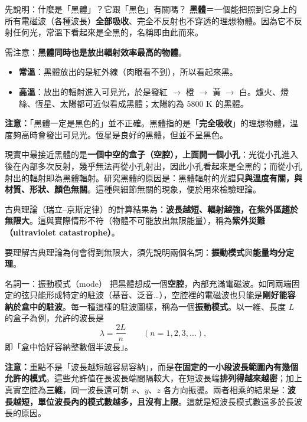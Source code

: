 \documentclass[11pt]{article}
\begin{document}
\begin{補充框}{先說明：什麼是「黑體」？它跟「黑色」有關嗎？}
\textbf{黑體}＝一個能把照到它身上的所有電磁波（各種波長）\textbf{全部吸收}、完全不反射也不穿透的理想物體。因為它不反射任何光，常溫下看起來是全黑的，名稱即由此而來。

需注意：\textbf{黑體同時也是放出輻射效率最高的物體}。

\begin{itemize}\setlength{\itemsep}{1pt}
\item \textbf{常溫}：黑體放出的是紅外線（肉眼看不到），所以看起來黑。
\item \textbf{高溫}：放出的輻射進入可見光，於是發紅 $\rightarrow$ 橙 $\rightarrow$ 黃 $\rightarrow$ 白。爐火、燈絲、恆星、太陽都可近似看成黑體；太陽約為 5800 K 的黑體。
\end{itemize}

\textbf{注意：}「黑體一定是黑色的」並不正確。黑體指的是「\textbf{完全吸收}」的理想物體，溫度夠高時會發出可見光。恆星是良好的黑體，但並不呈黑色。

現實中最接近黑體的是\textbf{一個中空的盒子（空腔），上面開一個小孔}：光從小孔進入後在內部多次反射，幾乎無法再從小孔射出，因此小孔看起來是全黑的；而從小孔射出的輻射即為黑體輻射。研究黑體的原因是：黑體輻射的光譜\textbf{只與溫度有關，與材質、形狀、顏色無關}。這種與細節無關的現象，便於用來檢驗理論。
\end{補充框}

古典理論（瑞立–京斯定律）的計算結果為：\textbf{波長越短、輻射越強，在紫外區趨於無限大}。這與實際情形不符（物體不可能放出無限能量），稱為\textbf{紫外災難（ultraviolet catastrophe）}。

要理解古典理論為何會得到無限大，須先說明兩個名詞：\textbf{振動模式}與\textbf{能量均分定理}。

\begin{補充框}{名詞一：振動模式（mode）}
把黑體想成一個\textbf{空腔}，內部充滿電磁波。如同兩端固定的弦只能形成特定的駐波（基音、泛音\dots），空腔裡的電磁波也只能是\textbf{剛好能容納於盒中的駐波}。每一種這樣的駐波圖樣，稱為一個\textbf{振動模式}。以一維、長度 $L$ 的盒子為例，允許的波長是
$$\lambda=\frac{2L}{n}\qquad(n=1,2,3,\dots),$$
即「盒中恰好容納整數個半波長」。

\textbf{注意：}重點不是「波長越短越容易容納」，而是\textbf{在固定的一小段波長範圍內有幾個允許的模式}。這些允許值在長波長端間隔較大，在短波長端\textbf{排列得越來越密}；加上真實空腔為\textbf{三維}，同一波長還可朝 $x$、$y$、$z$ 各方向振盪。兩者相乘的結果是：\textbf{波長越短，單位波長內的模式數越多，且沒有上限}。這就是短波長模式數遠多於長波長的原因。
\end{補充框}
\end{document}

